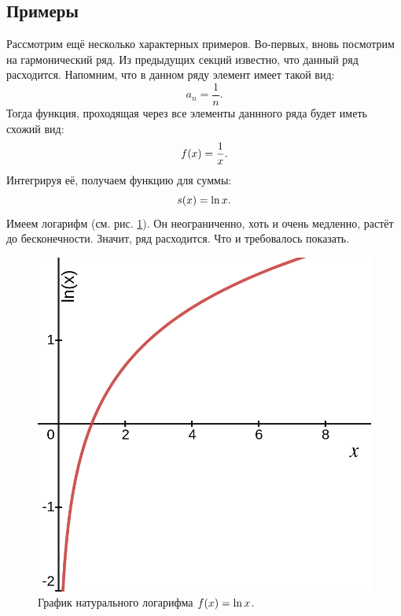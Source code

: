\documentclass[12pt]{article}
\begin{document}
\subsection{Примеры}
Рассмотрим ещё несколько характерных примеров. Во\--первых, вновь посмотрим на гармонический ряд. Из предыдущих секций известно, что данный ряд расходится. Напомним, что в данном ряду элемент имеет такой вид:
\begin{equation}
    a_n = \dfrac{1}{n}.
\end{equation}
Тогда функция, проходящая через все элементы даннного ряда будет иметь схожий вид:
\begin{equation}
    f\qty(x) = \dfrac{1}{x}.
\end{equation}
Интегрируя её, получаем функцию для суммы:
\begin{equation}
    s\qty(x) = \ln{x}.
\end{equation}
Имеем логарифм (см. рис. \ref{fig:8}). Он неограниченно, хоть и очень медленно, растёт до бесконечности. Значит, ряд расходится. Что и требовалось показать.
\begin{figure}[hbt]
    \centering
    \includegraphics[scale = 0.5]{fig8.png}
    \caption{График натурального логарифма $f\qty(x) = \ln{x}$.}
    \label{fig:8}
\end{figure}
\par
\end{document}
